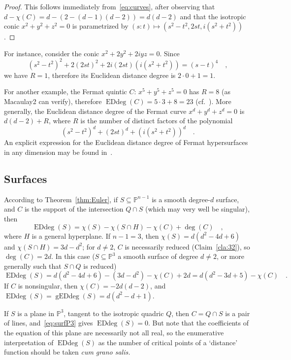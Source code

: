 \documentclass[11pt]{amsart}
\numberwithin{equation}{section}
\newcommand{\Pbb}{{\mathbb{P}}}
\DeclareMathOperator{\Edd}{EDdeg}
\DeclareMathOperator{\gEdd}{gEDdeg}
\begin{document}
\begin{proof}
This follows immediately from~\eqref{eq:curves}, after observing that
$d-\chi(C)=d-(2-(d-1)(d-2))=d(d-2)$ and that the isotropic conic $x^2+y^2+z^2=0$
is parametrized by $(s:t) \mapsto (s^2-t^2, 2st, i(s^2+t^2))$.
\end{proof}

For instance, consider the conic $x^2+2y^2+2iyz=0$. Since
\[
(s^2-t^2)^2 + 2(2st)^2 +2i(2st)(i (s^2+t^2)) =(s-t)^4\quad,
\]
we have $R=1$, therefore its Euclidean distance degree is $2\cdot 0+1=1$. 

For another example, the Fermat quintic $C$: $x^5+y^5+z^5=0$ 
has $R=8$ (as Macaulay2 can verify), therefore $\Edd(C) = 5\cdot 3 + 8 = 23$ 
(cf.~\cite[Example~2.5]{MR3451425}). More generally, the Euclidean distance degree
of the Fermat curve $x^d + y^d + z^d=0$ is $d(d-2)+R$, 
where $R$ is the number of distinct factors of the polynomial
\[
(s^2-t^2)^d + (2st)^d + (i(s^2+t^2))^d\quad.
\]
An explicit expression for the Euclidean distance degree of Fermat hypersurfaces
in any dimension may be found in~\cite[Theorem~4]{MR3574523}.

\subsection{Surfaces}\label{ss:surfaces}
According to Theorem~\ref{thm:Euler}, if $S\subseteq\Pbb^{n-1}$ is a smooth degree-$d$
surface, and $C$ is the support of the intersection $Q\cap S$ (which may very well be
singular), then
\[
\Edd(S)=\chi(S)-\chi(S\cap H) -\chi(C) + \deg(C)\quad,
\]
where $H$ is a general hyperplane. If $n-1=3$, then $\chi(S)=d(d^2-4d+6)$ and
$\chi(S\cap H)=3d-d^2$; for $d\ne 2$, $C$ is necessarily reduced (Claim~\ref{cla:32}), 
so $\deg(C)=2d$. In this case ($S\subseteq \Pbb^3$ a smooth surface of degree $d\ne 2$,
or more generally such that $S\cap Q$ is reduced)
\begin{equation}\label{eq:surfP3}
\Edd(S) = d(d^2-4d+6)-(3d-d^2)-\chi(C)+2d = d(d^2-3d+5) -\chi(C)\quad.
\end{equation}
If $C$ is nonsingular, then $\chi(C)=-2d(d-2)$, and $\Edd(S)=\gEdd(S)=d(d^2-d+1)$.

If $S$ is a plane in $\Pbb^3$, tangent to the isotropic quadric $Q$, then $C=Q\cap S$
is a pair of lines, and~\eqref{eq:surfP3} gives $\Edd(S)=0$. But note that the coefficients
of the equation of this plane are necessarily not all real, so the enumerative interpretation
of $\Edd(S)$ as the number of critical points of a `distance' function should be taken
{\it cum grano salis.\/}
\end{document}
